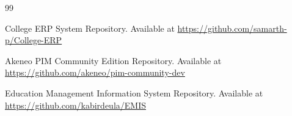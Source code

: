 \begin{thebibliography}{99}

College ERP System Repository. Available at \url{https://github.com/samarth-p/College-ERP}

Akeneo PIM Community Edition Repository. Available at \url{https://github.com/akeneo/pim-community-dev}

Education Management Information System Repository. Available at \url{https://github.com/kabirdeula/EMIS}

\end{thebibliography}